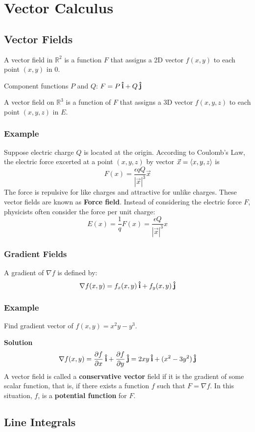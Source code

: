\chapter{Vector Calculus}

\section{Vector Fields}
A vector field in $\mathbb{R}^2$ is a function $F$ that assigns a 2D vector
$f(x,y)$ to each point $(x,y)$ in 0.

Component functions $P$ and $Q$: $F=P\:\boldsymbol{\hat{\textbf{i}}}+Q\:\boldsymbol{\hat{\textbf{j}}}$

A vector field on $\mathbb{R}^3$ is a function of $F$ that assigns a 3D vector
$f(x,y,z)$ to each point $(x,y,z)$ in $E$.

\subsection*{Example}
Suppose electric charge $Q$ is located at the origin. According to Coulomb's Law,
the electric force excerted at a point $(x,y,z)$ by vector $\vec{x}=\ev{x,y,z}$ is
$$F(x)=\frac{\epsilon qQ}{|\vec{x}|^3}\vec{x}$$
The force is repulsive for like charges and attractive for unlike charges. These
vector fields are known as \textbf{Force field}. Instead of considering the electric
force $F$, physicists often consider the force per unit charge:
$$E(x)=\frac{1}{q}F(x)=\frac{\epsilon Q}{|\vec{x}|^3}x$$

\subsection*{Gradient Fields}
A gradient of $\nabla f$ is defined by:
$$\nabla f(x,y)=f_x(x,y)\:\boldsymbol{\hat{\textbf{i}}}+f_y(x,y)\:\boldsymbol{\hat{\textbf{j}}}$$

\subsection*{Example}
Find gradient vector of $f(x,y)=x^2y-y^3$.

\textbf{Solution}
$$\nabla f(x,y)=\pdv{f}{x}\:\boldsymbol{\hat{\textbf{i}}} +\pdv{f}{y}\:\boldsymbol{\hat{\textbf{j}}}=2xy\:\boldsymbol{\hat{\textbf{i}}} +(x^2-3y^2)\:\boldsymbol{\hat{\textbf{j}}}$$
A vector field is called a \textbf{conservative vector} field if it is the gradient of some
scalar function, that is, if there exists a function $f$ such that $F=\nabla f$.
In this situation, $f$, is a \textbf{potential function} for $F$.

\section{Line Integrals}

